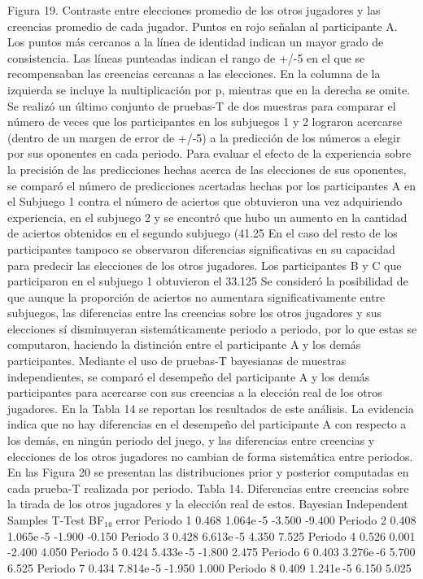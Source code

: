    
Figura 19. Contraste entre elecciones promedio de los otros jugadores y las creencias promedio de cada jugador. Puntos en rojo señalan al participante A. Los puntos más cercanos a la línea de identidad indican un mayor grado de consistencia.  Las líneas punteadas indican el rango de +/-5 en el que se recompensaban las creencias cercanas a las elecciones. En la columna de la izquierda se incluye la multiplicación por p, mientras que en la derecha se omite.
Se realizó un último conjunto de pruebas-T de dos muestras para comparar el número de veces que los participantes en los subjuegos 1 y 2 lograron acercarse (dentro de un margen de error de +/-5) a la predicción de los números a elegir por sus oponentes en cada periodo.
Para evaluar el efecto de la experiencia sobre la precisión de las predicciones hechas acerca de las elecciones de sus oponentes, se comparó el número de predicciones acertadas hechas por los participantes A en el Subjuego 1 contra el número de aciertos que obtuvieron una vez adquiriendo experiencia, en el subjuego 2 y se encontró que hubo un aumento en la cantidad de aciertos obtenidos en el segundo subjuego (41.25%
En el caso del resto de los participantes tampoco se observaron diferencias significativas en su capacidad para predecir las elecciones de los otros jugadores. Los participantes B y C que participaron en el subjuego 1 obtuvieron el 33.125%
Se consideró la posibilidad de que aunque la proporción de aciertos no aumentara significativamente entre subjuegos, las diferencias entre las creencias sobre los otros jugadores y sus elecciones sí disminuyeran sistemáticamente periodo a periodo, por lo que estas se computaron, haciendo la distinción entre  el participante A y los demás participantes. Mediante el uso de pruebas-T bayesianas de muestras independientes,  se comparó el desempeño del participante A y los demás participantes para acercarse con sus creencias a la elección real de los otros jugadores. En la Tabla 14 se reportan los resultados de este análisis. La evidencia indica que no hay diferencias en el desempeño del participante A con respecto a los demás, en ningún periodo del juego, y las diferencias entre creencias y elecciones de los otros jugadores no cambian de forma sistemática entre periodos. En las Figura 20 se presentan las distribuciones prior y posterior computadas en cada prueba-T realizada por periodo.
Tabla 14. Diferencias entre creencias sobre la tirada de los otros jugadores y la elección real de estos.
Bayesian Independent Samples T-Test 			
  	BF₁₀ 	error %
Periodo 1 		0.468 		1.064e -5 		-3.500		-9.400
Periodo 2 		0.408 		1.065e -5 		-1.900		-0.150
Periodo 3 		0.428 		6.613e -5 		4.350		7.525
Periodo 4 		0.526 		0.001 		-2.400		4.050
Periodo 5 		0.424 		5.433e -5 		-1.800		2.475
Periodo 6 		0.403 		3.276e -6 		5.700		6.525
Periodo 7 		0.434 		7.814e -5 		-1.950		1.000
Periodo 8 		0.409 		1.241e -5 		6.150		5.025
			
